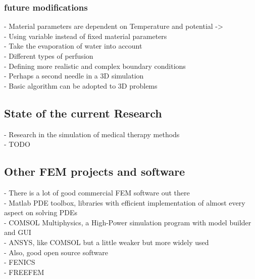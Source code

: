 \documentclass[parskip=half, titlepage=yes, 12pt, BCOR=12mm, DIV=calc]{scrartcl}
\begin{document}
\subsubsection{future modifications}
- Material parameters are dependent on Temperature and potential -> \\
- Using variable instead of fixed material parameters \\
- Take the evaporation of water into account \\ 
- Different types of perfusion \\
- Defining more realistic and complex boundary conditions \\
- Perhaps a second needle in a 3D simulation \\
- Basic algorithm can be adopted to 3D problems \\

\subsection{State of the current Research}
- Research in the simulation of medical therapy methods \\
- TODO \\


\subsection{Other FEM projects and software}

- There is a lot of good commercial FEM software out there \\
- Matlab PDE toolbox, libraries with efficient implementation of almost every aspect on solving PDEs \\
- COMSOL Multiphysics, a High-Power simulation program with model builder and GUI \\
- ANSYS, like COMSOL but a little weaker but more widely used\\

- Also, good open source software \\
- FENICS \\
- FREEFEM \\


\newpage


\clearpage
\nocite{*}
\printbibliography

\newpage

\appendix

 
\end{document}
